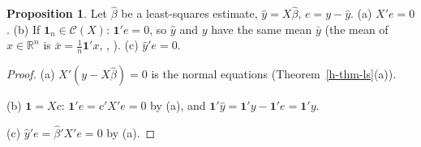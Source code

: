 \documentclass[12pt]{article}
\newcommand{\R}{\mathbb R}
\newcommand{\one}{\mathbf 1}
\theoremstyle{definition}
\newtheorem{proposition}[theorem]{Proposition}
\begin{document}
\begin{proposition}\label{h-prop-residuals}
Let \(\hat\beta\) be a least-squares estimate, \(\hat y=X\hat\beta\), \(e=y-\hat y\).
(a) \(X'e=0\). (b) If \(\one_n\in\mathcal C(X)\): \(\one'e=0\), so \(\hat y\) and \(y\) have the same mean \(\bar y\)
(the mean of \(x\in\R^n\) is \(\bar x=\frac1n\one'x\), , ).
(c) \(\hat y'e=0\).
\end{proposition}
\begin{proof}
(a) \(X'(y-X\hat\beta)=0\) is the normal equations (Theorem~\ref{h-thm-ls}(a)).

(b) \(\one=Xc\): \(\one'e=c'X'e=0\) by (a), and \(\one'\hat y=\one'y-\one'e=\one'y\).

(c) \(\hat y'e=\hat\beta'X'e=0\) by (a).
\end{proof}
\end{document}
